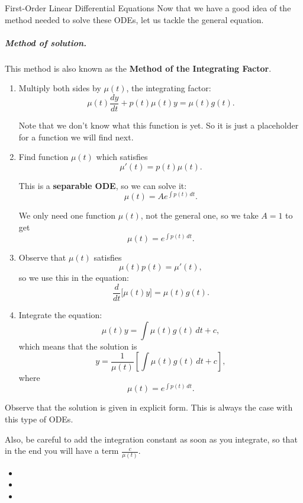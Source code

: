 \begin{submodule}{First-Order Linear Differential Equations}
Now that we have a good idea of the method needed to solve these ODEs, let us tackle the general equation.


\subparagraph{\color{cyan}Method of solution. } This method is also known as the \textbf{\color{cyan}Method of the Integrating Factor}. 
\begin{enumerate}[label={\bf \arabic*. } ]
\item Multiply both sides by $\mu(t)$, the integrating factor:
$$
\mu(t) \frac{dy}{dt} + p(t)\mu(t) y = \mu(t) g(t).
$$

Note that we don't know what this function is yet. So it is just a placeholder for a function we will find next.

\item Find function $\mu(t)$ which satisfies
$$
\mu'(t) = p(t) \mu(t).
$$

This is a \textbf{\color{cyan}separable ODE}, so we can solve it:
$$
\mu(t) = A e^{\int p(t) \, dt}.
$$

We only need one function $\mu(t)$, not the general one, so we take $A=1$ to get
$$
\mu(t) = e^{\int p(t) \, dt}.
$$

\item Observe that $\mu(t)$ satisfies
$$
\mu(t) p(t) = \mu'(t),
$$
so we use this in the equation:
$$
\frac{d}{dt} \big[ \mu(t) y \big] = \mu(t) g(t).
$$

\item Integrate the equation:
$$
\mu(t) y = \int \mu(t) g(t) \, dt + c,
$$
which means that the solution is
$$
y = \frac{1}{\mu(t)} \left[ \int \mu(t) g(t) \, dt + c \right],
$$
where 
$$
\mu(t) = e^{\int p(t) \, dt}.
$$

\end{enumerate}

\begin{important}
	Observe that the solution is given in explicit form. This is always the case with this type of ODEs.
	
	Also, be careful to add the integration constant as soon as you integrate, so that in the end you will have a term $\frac{c}{\mu(t)}$.
\end{important}


\begin{video}
\begin{itemize}
	\item {}
	\item {}
	\item {}
\end{itemize}	
\end{video}

\end{submodule}


